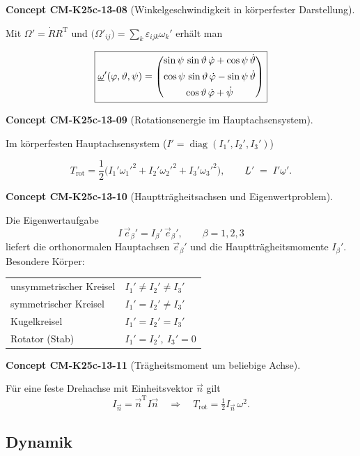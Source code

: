 \documentclass[10pt, letterpaper]{article}
\newcommand{\CustomHeading}[3]{%
  \par\medskip\noindent%
  \textbf{#1 #2} \textnormal{(#3)}.\enskip%
}
\newenvironment{CONC}[2]{\CustomHeading{Concept}{#1}{#2}}{}
\begin{document}
\begin{CONC}{CM-K25c-13-08}{Winkelgeschwindigkeit in körperfester Darstellung}
Mit $\Omega'=\dot R R^{\mathrm T}$ und
$\bigl(\Omega'_{ij}\bigr)=\sum_k\varepsilon_{ijk}\omega_k'$ erhält man

\[
  \boxed{%
    \underline{\omega}'(\varphi,\vartheta,\psi)
    =
    \begin{pmatrix}
      \sin\psi\,\sin\vartheta\,\dot\varphi
      +\cos\psi\,\dot\vartheta \\[4pt]
      \cos\psi\,\sin\vartheta\,\dot\varphi
      -\sin\psi\,\dot\vartheta \\[4pt]
      \cos\vartheta\,\dot\varphi+\dot\psi
    \end{pmatrix}}
\]
\end{CONC}

\begin{CONC}{CM-K25c-13-09}{Rotationsenergie im Hauptachsensystem}
Im körperfesten Hauptachsensystem ($I'=\operatorname{diag}(I_1',I_2',I_3')$)

\[
  T_{\text{rot}}
  =\frac{1}{2}
    \bigl(I_1'\omega_1'^{2}+I_2'\omega_2'^{2}+I_3'\omega_3'^{2}\bigr),
  \qquad
  \underline L'\;=\;I'\underline\omega'.
\]
\end{CONC}

\begin{CONC}{CM-K25c-13-10}{Hauptträgheitsachsen und Eigenwertproblem}
Die Eigenwertaufgabe
\[
  I\,\vec e_\beta' = I_\beta'\,\vec e_\beta',
  \qquad \beta=1,2,3
\]
liefert die orthonormalen Hauptachsen $\vec e_\beta'$ und die
Hauptträgheitsmomente $I_\beta'$.  
Besondere Körper:

\begin{tabular}{@{}ll@{}}
unsymmetrischer Kreisel & $I_1'\neq I_2'\neq I_3'$ \\
symmetrischer Kreisel   & $I_1'=I_2'\neq I_3'$ \\
Kugelkreisel            & $I_1'=I_2'=I_3'$ \\
Rotator (Stab)          & $I_1'=I_2',\ I_3'=0$
\end{tabular}
\end{CONC}

\begin{CONC}{CM-K25c-13-11}{Trägheitsmoment um beliebige Achse}
Für eine feste Drehachse mit Einheitsvektor $\vec n$ gilt
\[
  I_{\vec n}= \vec n^{\mathrm T} I \vec n
  \quad\Longrightarrow\quad
  T_{\text{rot}}=\tfrac12 I_{\vec n}\,\omega^{2}.
\]
\end{CONC}

\subsection{Dynamik}
\end{document}
